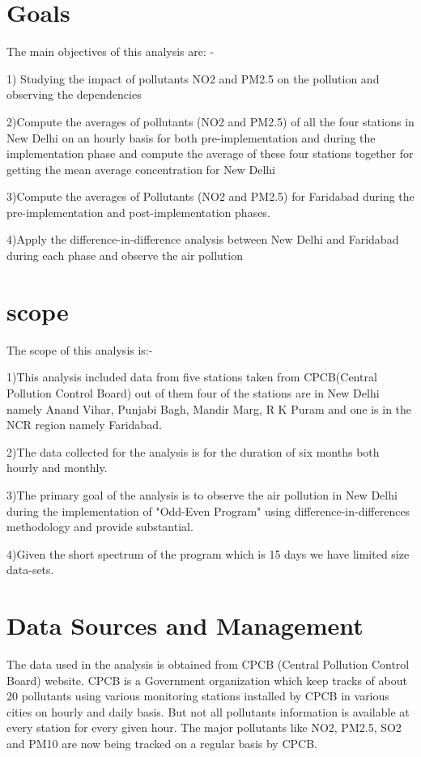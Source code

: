 \documentclass{report}
\begin{document}
\section{Goals}
The main objectives of this analysis are: -

1) Studying the impact of pollutants NO2 and PM2.5 on the pollution and observing the dependencies

2)Compute the averages of pollutants (NO2 and PM2.5) of all the four stations in New Delhi on an hourly basis for both pre-implementation and during the implementation phase and compute the average of these four stations together for getting the mean average concentration for New Delhi

3)Compute the averages of Pollutants (NO2 and PM2.5) for Faridabad during the pre-implementation and post-implementation phases.

4)Apply the difference-in-difference analysis between New Delhi and Faridabad during each phase and observe the air pollution



\section{scope}
The scope of this analysis is:-

1)This analysis included data from five stations taken from CPCB(Central Pollution Control Board) out of them four of the stations are in New Delhi namely Anand Vihar, Punjabi Bagh, Mandir Marg, R K Puram and one is in the NCR region namely Faridabad.

2)The data collected for the analysis is for the duration of six months both hourly and monthly.

3)The primary goal of the analysis is to observe the air pollution in New Delhi during the implementation of "Odd-Even Program" using difference-in-differences methodology and provide substantial.

4)Given the short spectrum of the program which is 15 days we have limited size data-sets.


\section{Data Sources and Management}
The data used in the analysis is obtained from CPCB (Central Pollution Control Board) website. CPCB is a Government organization which keep tracks of about 20 pollutants using various monitoring stations installed by CPCB in various cities on  hourly and daily basis. But not all pollutants information is available at every station for every given hour. The major pollutants like NO2, PM2.5, SO2 and PM10 are now being tracked on a regular basis by CPCB. 
\end{document}
